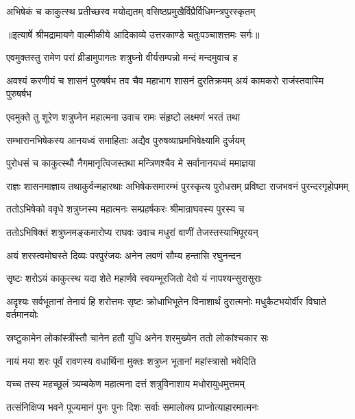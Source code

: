 \twolineshloka
{अभिषेकं च काकुत्स्थ प्रतीच्छस्व मयोद्यतम्}
{वसिष्ठप्रमुखैर्विप्रैर्विधिमन्त्रपुरस्कृतम्} %


{॥इत्यार्षे श्रीमद्रामायणे वाल्मीकीये आदिकाव्ये उत्तरकाण्डे चतुःपञ्चाशत्तमः सर्गः॥}


\twolineshloka
{एवमुक्तस्तु रामेण परां व्रीडामुपागतः}
{शत्रुघ्नो वीर्यसम्पन्नो मन्दं मन्दमुवाच ह} %

\threelineshloka
{अवश्यं करणीयं च शासनं पुरुषर्षभ}
{तव चैव महाभाग शासनं दुरतिक्रमम्}
{अयं कामकरो राजंस्तवास्मि पुरुषर्षभ} %

\twolineshloka
{एवमुक्ते तु शूरेण शत्रुघ्नेन महात्मना}
{उवाच रामः संहृष्टो लक्ष्मणं भरतं तथा} %

\twolineshloka
{सम्भारानभिषेकस्य आनयध्वं समाहिताः}
{अद्यैव पुरुषव्याघ्रमभिषेक्ष्यामि दुर्जयम्} %

\twolineshloka
{पुरोधसं च काकुत्स्थौ नैगमानृत्विजस्तथा}
{मन्त्रिणश्चैव मे सर्वानानयध्वं ममाज्ञया} %

\threelineshloka
{राज्ञः शासनमाज्ञाय तथाकुर्वन्महारथाः}
{अभिषेकसमारम्भं पुरस्कृत्य पुरोधसम्}
{प्रविष्टा राजभवनं पुरन्दरगृहोपमम्} %

\twolineshloka
{ततोऽभिषेको ववृधे शत्रुघ्नस्य महात्मनः}
{सम्प्रहर्षकरः श्रीमान्राघवस्य पुरस्य च} %

\twolineshloka
{ततोऽभिषिक्तं शत्रुघ्नमङ्कमारोप्य राघवः}
{उवाच मधुरां वाणीं तेजस्तस्याभिपूरयन्} %

\twolineshloka
{अयं शरस्त्वमोघस्ते दिव्यः परपुरंजयः}
{अनेन लवणं सौम्य हन्तासि रघुनन्दन} %

\twolineshloka
{सृष्टः शरोऽयं काकुत्स्थ यदा शेते महार्णवे}
{स्वयम्भूरजितो देवो यं नापश्यन्सुरासुराः} %

\threelineshloka
{अदृश्यः सर्वभूतानां तेनायं हि शरोत्तमः}
{सृष्टः क्रोधाभिभूतेन विनाशार्थं दुरात्मनोः}
{मधुकैटभयोर्वीर विघाते वर्तमानयोः} %

\twolineshloka
{स्रष्टुकामेन लोकांस्त्रींस्तौ चानेन हतौ युधि}
{अनेन शरमुख्येन ततो लोकांश्चकार सः} %

\twolineshloka
{नायं मया शरः पूर्वं रावणस्य वधार्थिना}
{मुक्तः शत्रुघ्न भूतानां महांस्त्रासो भवेदिति} %

\twolineshloka
{यच्च तस्य महच्छूलं त्र्यम्बकेण महात्मना}
{दत्तं शत्रुविनाशाय मधोरायुधमुत्तमम्} %

\twolineshloka
{तत्संनिक्षिप्य भवने पूज्यमानं पुनः पुनः}
{दिशः सर्वाः समालोक्य प्राप्नोत्याहारमात्मनः} %

